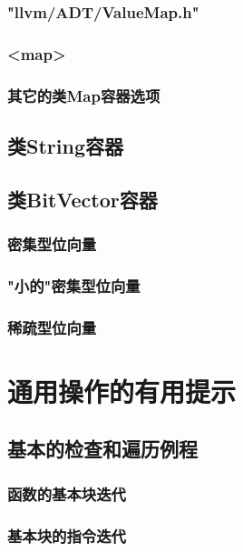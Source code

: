 \documentclass[12pt,a4paper]{article}
\begin{document}
\subsubsection{"llvm/ADT/ValueMap.h"}

\subsubsection{<map>}

\subsubsection{其它的类Map容器选项}

\subsection{类String容器}

\subsection{类BitVector容器}

\subsubsection{密集型位向量}

\subsubsection{"小的"密集型位向量}

\subsubsection{稀疏型位向量}

\section{通用操作的有用提示}

\subsection{基本的检查和遍历例程}

\subsubsection{函数的基本块迭代}

\subsubsection{基本块的指令迭代}
\end{document}
